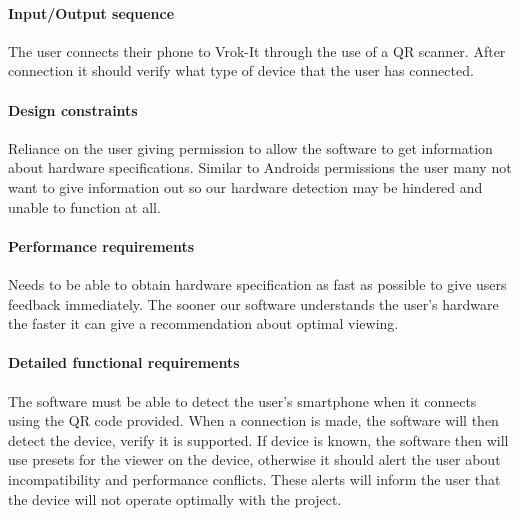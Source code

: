 \documentclass[letterpaper, 10pt, draftclsnofoot, compsoc, onecolumn]{IEEEtran}
\begin{document}
\paragraph[Input/Output sequence]{\rmfamily\bfseries\color{black}
Input/Output sequence }
{\color{black}
	The user connects their phone to Vrok-It through the use of a QR scanner. After connection it should verify what type of 
	device that the user has connected.
}

\paragraph[Design constraints]{\rmfamily\bfseries\color{black} Design
constraints }
{\color{black}
	Reliance on the user giving permission to allow the software to get information about hardware specifications. Similar to 
	Androids permissions the user many not want to give information out so our hardware detection may be hindered and 
	unable to function at all. 
}

\paragraph[Performance requirements]{\rmfamily\bfseries\color{black}
Performance requirements }
{\color{black}
	Needs to be able to obtain hardware specification as fast as possible to give users feedback immediately. The sooner 
	our software understands the user's hardware the faster it can give a recommendation about optimal viewing. 
}

\paragraph[Detailed functional requirements]{\rmfamily\bfseries\color{black}
Detailed functional requirements }
{\color{black}
	The software must be able to detect the user's smartphone when it connects using the QR code provided. When a 
	connection is made, the software will then detect the device, verify it is supported. If device is known, the software 
	then will use presets for the viewer on the device, otherwise it should alert the user about incompatibility and 
	performance conflicts. These alerts will inform the user that the device will not operate optimally with the project. 
}

\end{document}
